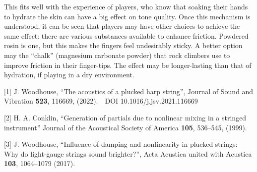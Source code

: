   This fits well with the experience of players, who know that soaking their 
  hands to hydrate the skin can have a big effect on tone quality. Once this 
  mechanism is understood, it can be seen that players may have other choices 
  to achieve the same effect: there are various substances available to enhance 
  friction. Powdered rosin is one, but this makes the fingers feel undesirably 
  sticky. A better option may the “chalk” (magnesium carbonate powder) that 
  rock climbers use to improve friction in their finger-tips. The effect may be 
  longer-lasting than that of hydration, if playing in a dry environment. 



  \sectionreferences{}[1] J. Woodhouse, ``The acoustics of a plucked harp 
  string'', Journal of Sound and Vibration \textbf{523}, 116669, (2022).~~DOI 
  10.1016/j.jsv.2021.116669 

  [2] H. A. Conklin, ``Generation of partials due to nonlinear mixing in a 
  stringed instrument'' Journal of the Acoustical Society of America 
  \textbf{105}, 536–545, (1999). 

  [3] J. Woodhouse, ``Influence of damping and nonlinearity in plucked strings: 
  Why do light-gauge strings sound brighter?'', Acta Acustica united with 
  Acustica \textbf{103}, 1064–1079 (2017). 